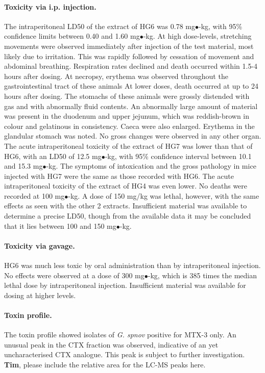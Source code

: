 \documentclass[12pt]{article}
\begin{document}
\paragraph{Toxicity via i.p. injection.}
The intraperitoneal LD50 of the extract of HG6 was 0.78 mg$\bullet$-kg, with 95\% confidence limits between 0.40 and 1.60 mg$\bullet$-kg. At high dose-levels, stretching movements were observed immediately after injection of the test material, most likely due to irritation. This was rapidly followed by cessation of movement and abdominal breathing. Respiration rates declined and death occurred within 1.5-4 hours after dosing. At necropsy, erythema was observed throughout the gastrointestinal tract of these animals At lower doses, death occurred at up to 24 hours after dosing. The stomachs of these animals were grossly distended with gas and with abnormally fluid contents. An abnormally large amount of material was present in the duodenum and upper jejunum, which was reddish-brown in colour and gelatinous in consistency. Caeca were also enlarged. Erythema in the glandular stomach was noted. No gross changes were observed in any other organ. 
The acute intraperitoneal toxicity of the extract of HG7 was lower than that of HG6, with an LD50 of 12.5 mg$\bullet$-kg, with 95\% confidence interval between 10.1 and 15.3 mg$\bullet$-kg. The symptoms of intoxication and the gross pathology in mice injected with HG7 were the same as those recorded with HG6. 
The acute intraperitoneal toxicity of the extract of HG4 was even lower. No deaths were recorded at 100 mg$\bullet$-kg. A dose of 150 mg/kg was lethal, however, with the same effects as seen with the other 2 extracts. Insufficient material was available to determine a precise LD50, though from the available data it may be concluded that it lies between 100 and 150 mg$\bullet$-kg.

\paragraph{Toxicity via gavage.}
 HG6 was much less toxic by oral administration than by intraperitoneal injection. No effects were observed at a dose of 300 mg$\bullet$-kg, which is 385 times the median lethal dose by intraperitoneal injection. Insufficient material was available for dosing at higher levels.​

\paragraph{Toxin profile.}
The toxin profile showed isolates of \emph{G. spnov} positive for MTX-3 only. An unusual peak in the CTX fraction was observed, indicative of an yet uncharacterised CTX analogue. This peak is subject to further investigation. \\ \textbf{Tim}, please include the relative area for the LC-MS peaks here.\\
\end{document}
